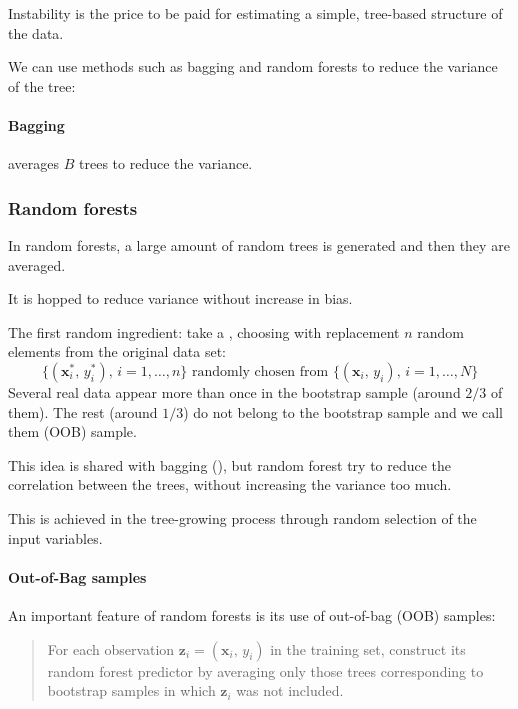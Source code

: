 Instability is the price to be paid for estimating a simple, tree-based structure of the
data.

We can use methods such as bagging and random forests to reduce the variance of the tree:

\paragraph{Bagging} averages $B$ trees to reduce the variance.


\subsubsection{Random forests}

In random forests, a large amount of random trees is generated and then they
are averaged.

It is hopped to reduce variance without increase in bias.

The first random ingredient: take a , choosing with
replacement $n$ random elements from the original data set:
\begin{equation*}
	\{
	(
	\boldsymbol x_i^*,\,y_i^*
	),\, i = 1,\dots,n
	\} \text{ randomly chosen from }
	\{
	(
	\boldsymbol x_i,\,y_i
	),\, i = 1,\dots,N
	\}
\end{equation*}
Several real data appear more than once in the bootstrap sample (around $2/3$ of them).
The rest (around $1/3$) do not belong to the bootstrap sample and we call them
 (OOB) sample.

This idea is shared with bagging (), but
random forest try to reduce the correlation between the trees,
without increasing the variance too much.

This is achieved in the tree-growing process through random selection of the
input variables.

\paragraph{Out-of-Bag samples}
An important feature of random forests is its use of out-of-bag (OOB) samples:
\begin{quote}
	For each observation $\boldsymbol z_i = (\boldsymbol x_i,\,y_i)$ in the
	training set, construct its random forest predictor by averaging only
	those trees corresponding to bootstrap samples in which $\boldsymbol z_i$
	was not included.
\end{quote}

